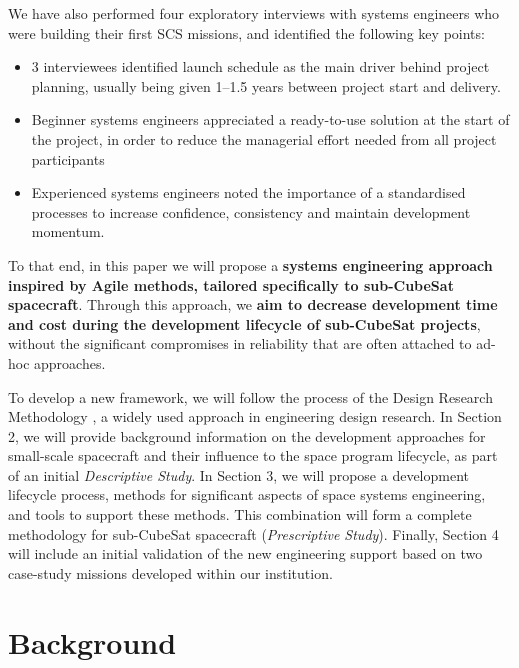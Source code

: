 \documentclass[journal,10pt]{IEEEtran}
\begin{document}
	

	We have also performed four exploratory interviews with systems engineers who were building their first \acs{SCS} missions, and identified the following key points:%

	\begin{itemize}
		\item
		3 interviewees identified launch schedule as the main driver behind project planning, usually being given 1--1.5 years between project start and delivery.
		\item
		Beginner systems engineers appreciated a ready-to-use solution at the start of the project, in order to reduce the managerial effort needed from all project participants
		\item Experienced systems engineers noted the importance of a standardised processes to increase confidence, consistency and maintain development momentum.
	\end{itemize}
	
	To that end, in this paper we will propose a \textbf{systems engineering approach inspired by Agile methods, tailored specifically to sub-CubeSat spacecraft}. Through this approach, we \textbf{aim to decrease development time and cost during the development lifecycle of sub-CubeSat projects}, without the significant compromises in reliability that are often attached to ad-hoc approaches. 

	To develop a new framework, we will follow the process of the Design Research Methodology \autocite{blessingDRMDesignResearch2009}, a widely used approach in engineering design research.
	In Section 2, we will provide background information on the development approaches for small-scale spacecraft and their influence to the space program lifecycle, as part of an initial \emph{Descriptive Study}.
	In Section 3, we will propose a development lifecycle process, methods for significant aspects of space systems engineering, and tools to support these methods. This combination will form a complete methodology for sub-CubeSat spacecraft (\emph{Prescriptive Study}). Finally, Section 4 will include an initial validation of the new engineering support based on two case-study missions developed within our institution.


\section{Background}
\end{document}
